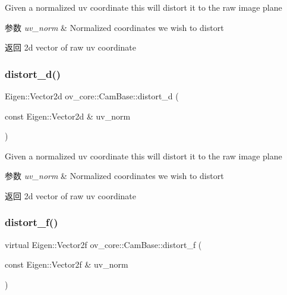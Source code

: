 Given a normalized uv coordinate this will distort it to the raw image plane 


\begin{DoxyParams}{参数}
{\em uv\+\_\+norm} & Normalized coordinates we wish to distort \\
\hline
\end{DoxyParams}
\begin{DoxyReturn}{返回}
2d vector of raw uv coordinate 
\end{DoxyReturn}
\mbox{\label{classov__core_1_1CamBase_acf981dbc008c5929bf32ddde80b04caf}} 
\subsubsection{\texorpdfstring{distort\+\_\+d()}{distort\_d()}}
{\footnotesize\ttfamily Eigen\+::\+Vector2d ov\+\_\+core\+::\+Cam\+Base\+::distort\+\_\+d (\begin{DoxyParamCaption}\item[{const Eigen\+::\+Vector2d \&}]{uv\+\_\+norm }\end{DoxyParamCaption})\hspace{0.3cm}{\ttfamily [inline]}}



Given a normalized uv coordinate this will distort it to the raw image plane 


\begin{DoxyParams}{参数}
{\em uv\+\_\+norm} & Normalized coordinates we wish to distort \\
\hline
\end{DoxyParams}
\begin{DoxyReturn}{返回}
2d vector of raw uv coordinate 
\end{DoxyReturn}
\mbox{\label{classov__core_1_1CamBase_a00902793219107474dc21f762fb14556}} 
\subsubsection{\texorpdfstring{distort\+\_\+f()}{distort\_f()}}
{\footnotesize\ttfamily virtual Eigen\+::\+Vector2f ov\+\_\+core\+::\+Cam\+Base\+::distort\+\_\+f (\begin{DoxyParamCaption}\item[{const Eigen\+::\+Vector2f \&}]{uv\+\_\+norm }\end{DoxyParamCaption})\hspace{0.3cm}{\ttfamily [pure virtual]}}



